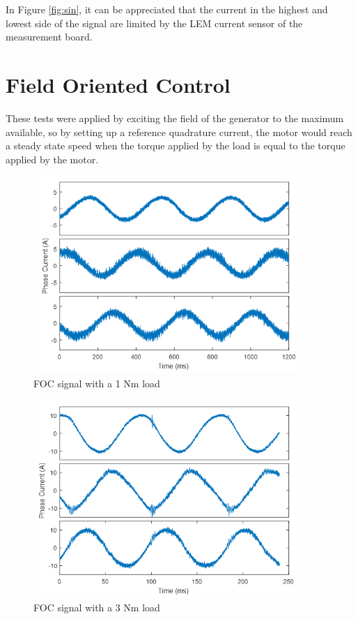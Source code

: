 In Figure \ref{fig:sin}, it can be appreciated that the current in the highest and lowest side of the signal are limited by the LEM current sensor of the measurement board.

\clearpage
\section{Field Oriented Control}

These tests were applied by exciting the field of the generator to the maximum available, so by setting up a reference quadrature current, the motor would reach a steady state speed when the torque applied by the load is equal to the torque applied by the motor.

\begin{figure}[h!p]
\centering
\includegraphics[width=10cm]{Images/waveforms/sin4.png} 
\caption[sin4]{FOC signal with a 1 Nm load}
\label{fig:sin4}
\end{figure}

\begin{figure}[h!p]
\centering
\includegraphics[width=10cm]{Images/waveforms/sin5.png} 
\caption[sin5]{FOC signal with a 3 Nm load}
\label{fig:sin5}
\end{figure}

